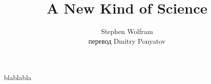 

\title{A New Kind of Science}
\author{Stephen Wolfram\\
{\tiny перевод Dmitry Ponyatov }}


\maketitle

blablabla

